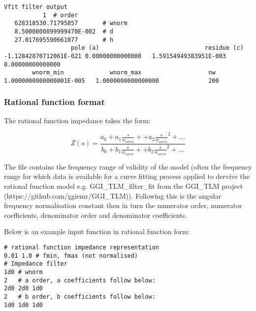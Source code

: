 \begin{small}
\begin{verbatim}
Vfit filter output
           1  # order
   628318530.71795857       # wnorm
   8.5000000899999470E-002  # d
   27.017695590661077       # h
                   pole (a)                              residue (c)
-1.12842870712061E-021 0.00000000000000   1.59154949383951E-003 0.00000000000000     
        wnorm_min             wnorm_max                   nw
1.0000000000000001E-005   1.0000000000000000              200
\end{verbatim}
\end{small}

\subsubsection{Rational function format}

The rational function impedance takes the form:

\begin{equation}\label{eq:rat1}
Z \left( s \right) = \frac{a_0+a_1 \frac{s}{w_{norm}} + +a_2 \frac{s}{w_{norm}}^2 + \dots}
{b_0+b_1 \frac{s}{w_{norm}} + +b_2 \frac{s}{w_{norm}}^2 + \dots}
\end{equation} 

The file contains the frequency range of validity of the model (often the frequency range for which data is available for a curve fitting process applied to dervive the rational function model e.g. GGI\_TLM\_filter\_fit 
from the GGI\_TLM project (https://github.com/ggiemr/GGI\_TLM)). Following this is the angular frequency normalisation constant then in turn the numerator order, numerator coefficients, denominator order and denominator coefficients.

Below is an example input function in rational function form:

\begin{verbatim}
# rational function impedance representation
0.01 1.0 # fmin, fmax (not normalised)
# Impedance filter
1d0 # wnorm
2   # a order, a coefficients follow below:
2d0 2d0 1d0
2   # b order, b coefficients follow below:
1d0 1d0 1d0
\end{verbatim}



\clearpage
